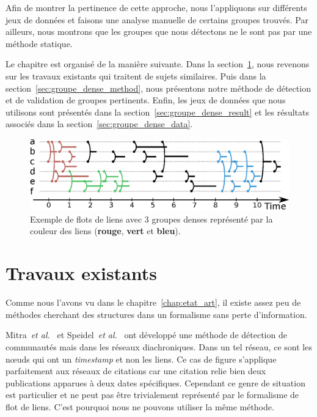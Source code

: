 Afin de montrer la pertinence de cette approche, nous l'appliquons sur différents jeux de données et faisons une analyse manuelle de certains groupes trouvés.
Par ailleurs, nous montrons que les groupes que nous détectons ne le sont pas par une méthode statique.

Le chapitre est organisé de la manière suivante.
Dans la section~\ref{sec:groupe_dense_existant}, nous revenons sur les travaux existants qui traitent de sujets similaires.
Puis dans la section~\ref{sec:groupe_dense_method}, nous présentons notre méthode de détection et de validation de groupes pertinents.
Enfin, les jeux de données que nous utilisons sont présentés dans la section~\ref{sec:groupe_dense_result} et les résultats associés dans la section~\ref{sec:groupe_dense_data}.

\begin{figure}
\centering
\includegraphics[width=\linewidth]{img/GroupeDense/GroupExample/Zone_dense.eps}
\caption{Exemple de flots de liens avec 3 groupes denses représenté par la couleur des liens (\textcolor{brique}{\textbf{rouge}}, \textcolor{vert_turquoise}{\textbf{vert}} et \textcolor{bleu_window}{\textbf{bleu}}).
}
\label{fig:exemple_groupe_dens}
\end{figure}

\section{Travaux existants}
\label{sec:groupe_dense_existant}

Comme nous l'avons vu dans le chapitre~\ref{chap:etat_art}, il existe assez peu de méthodes cherchant des structures dans un formalisme sans perte d'information.

Mitra~\emph{et al.}~\cite{Mitra2012a} et Speidel~\emph{et al.}~\cite{Speidel2015} ont développé une méthode de détection de communautés mais dans les réseaux diachroniques.
Dans un tel réseau, ce sont les n\oe uds qui ont un \emph{timestamp} et non les liens.
Ce cas de figure s'applique parfaitement aux réseaux de citations car une citation relie bien deux publications apparues à deux dates spécifiques.
Cependant ce genre de situation est particulier et ne peut pas être trivialement représenté par le formalisme de flot de liens.
C'est pourquoi nous ne pouvons utiliser la même méthode. 

